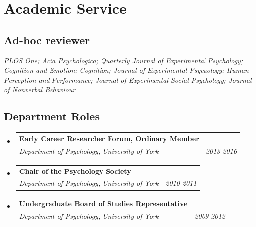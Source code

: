 \documentclass[letterpaper,11pt]{article}
\makeatletter
\newcommand{\resumeSubheading}[4]{
  \vspace{-1pt}\item
    \begin{tabular*}{0.97\textwidth}{l@{\extracolsep{\fill}}r}
      \textbf{#1} & #2 \\
      \textit{\small#3} & \textit{\small #4} \\
    \end{tabular*}\vspace{-5pt}
}
\newcommand{\resumeSubHeadingListStart}{\begin{itemize}[label = {},leftmargin=*]}
\newcommand{\resumeSubHeadingListEnd}{\end{itemize}}
\makeatother
\begin{document}
\section{Academic Service} 
\subsection*{Ad-hoc reviewer}
\begin{center}
\textit{PLOS One; Acta Psychologica; Quarterly Journal of Experimental Psychology; Cognition and Emotion; Cognition; Journal of Experimental Psychology: Human Perception and Performance; Journal of Experimental Social Psychology; Journal of Nonverbal Behaviour}
\end{center}
\subsection*{Department Roles}
  \resumeSubHeadingListStart
    \resumeSubheading
      {Early Career Researcher Forum, Ordinary Member}{}
      {Department of Psychology, University of York}{2013-2016}
    \resumeSubheading
      {Chair of the Psychology Society}{}
      {Department of Psychology, University of York}{2010-2011}
    \resumeSubheading
      {Undergraduate Board of Studies Representative}{}
      {Department of Psychology, University of York}{2009-2012}
  \resumeSubHeadingListEnd
  
%
\end{document}
